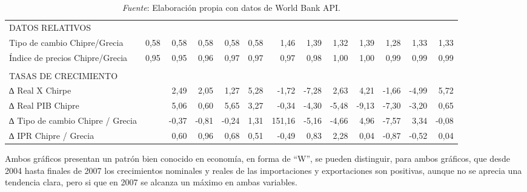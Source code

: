 \documentclass[a4paper,openright,12pt]{book}
\begin{document}
\begin{table}[]
{\begin{tabular}{@{}lrrrrrrrrrrrr@{}}
        DATOS RELATIVOS                                                 &          &          &          &          &          &          &          &          &          &          &          &          \\
        Tipo de cambio Chipre/Grecia                                    & 0,58     & 0,58     & 0,58     & 0,58     & 0,58     & 1,46     & 1,39     & 1,32     & 1,39     & 1,28     & 1,33     & 1,33     \\
        Índice de precios Chipre/Grecia                                 & 0,95     & 0,95     & 0,96     & 0,97     & 0,97     & 0,97     & 0,98     & 1,00     & 1,00     & 0,99     & 0,99     & 0,99     \\
                                                                        &          &          &          &          &          &          &          &          &          &          &          &          \\
        TASAS DE CRECIMIENTO                                            &          &          &          &          &          &          &          &          &          &          &          &          \\
        ∆ Real X Chirpe                                                 &          & 2,49     & 2,05     & 1,27     & 5,28     & -1,72    & -7,28    & 2,63     & 4,21     & -1,66    & -4,99    & 5,72     \\
        ∆ Real PIB Chipre                                               &          & 5,06     & 0,60     & 5,65     & 3,27     & -0,34    & -4,30    & -5,48    & -9,13    & -7,30    & -3,20    & 0,65     \\
        ∆ Tipo de cambio Chipre / Grecia                                &          & -0,37    & -0,81    & -0,24    & 1,31     & 151,16   & -5,16    & -4,66    & 4,96     & -7,57    & 3,34     & -0,08    \\
        ∆ IPR Chipre / Grecia                                           &          & 0,60     & 0,96     & 0,68     & 0,51     & -0,49    & 0,83     & 2,28     & 0,04     & -0,87    & -0,52    & 0,04     \\ \bottomrule
        \end{tabular}}
    \caption*{\textit{Fuente}: Elaboración propia con datos de World Bank API.}
\end{table}

Ambos gráficos presentan un patrón bien conocido en economía, en forma de “W”, se pueden distinguir, para ambos gráficos, que desde 2004 hasta finales de 2007 los crecimientos nominales y reales de las importaciones y exportaciones son positivas, aunque no se aprecia una tendencia clara, pero si que en 2007 se alcanza un máximo en ambas variables.
\end{document}
